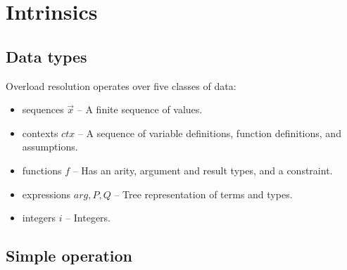 \section{Intrinsics}
\label{sec:intrinsics}



\subsection{Data types}
\label{subsec:data_types}

Overload resolution operates over five classes of data:
  \begin{itemize}
    \item
      sequences $\overrightarrow{x}$ -- A finite sequence of values.
    \item
      contexts $ctx$ -- A sequence of variable definitions, function definitions, and assumptions.
    \item
      functions $f$ -- Has an arity, argument and result types, and a constraint.
    \item
      expressions $arg, P, Q$ -- Tree representation of terms and types.
    \item
      integers $i$ -- Integers.
  \end{itemize}



\subsection{Simple operation}
\label{subsec:intrinsics.operations}

